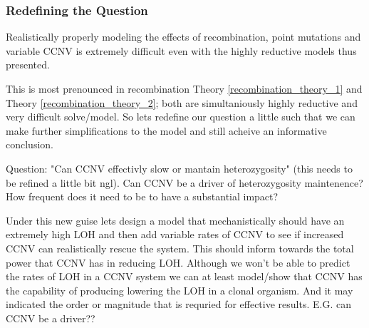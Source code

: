 \documentclass{article}
\begin{document}
    



    \subsubsection{Redefining the Question}
    Realistically properly modeling the effects of recombination, point mutations and variable CCNV is extremely difficult even with the highly reductive models thus presented.   
    
    This is most prenounced in recombination Theory \ref{recombination_theory_1} and Theory \ref{recombination_theory_2}; both are simultaniously highly reductive and very difficult solve/model.   So lets redefine our question a little such that we can make further simplifications to the model and still acheive an informative conclusion.

    Question: "Can CCNV effectivly slow or mantain heterozygosity" (this needs to be refined a little bit ngl).  Can CCNV be a driver of heterozygosity maintenence?   How frequent does it need to be to have a substantial impact?

    Under this new guise lets design a model that mechanistically should have an extremely high LOH and then add variable rates of CCNV to see if increased CCNV can realistically rescue the system.  This should inform towards the total power that CCNV has in reducing LOH.  Although we won't be able to predict the rates of LOH in a CCNV system we can at least model/show that CCNV has the capability of producing lowering the LOH in a clonal organism.  And it may indicated the order or magnitude that is requried for effective results.  E.G. can CCNV be a driver??
\end{document}
